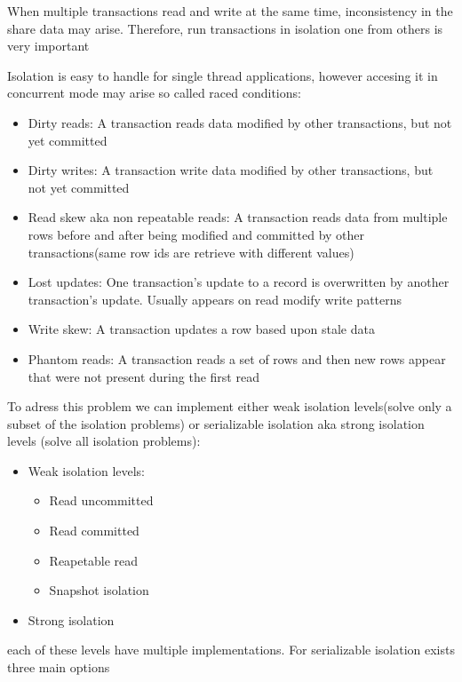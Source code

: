 \documentclass[../../main.tex]{subfiles}
\begin{document}
\begin{definition}[Isolation]
    When multiple transactions read and write at the same time, inconsistency in the
    share data may arise. Therefore, run transactions in isolation one from others is
    very important
\end{definition}
Isolation is easy to handle for single thread applications, however accesing it in
concurrent mode may arise so called raced conditions:
\begin{itemize}
    \item Dirty reads:
        A transaction reads data modified by other transactions, but not yet committed
    \item Dirty writes:
        A transaction write data modified by other transactions, but not yet committed
    \item Read skew aka non repeatable reads:
        A transaction reads data from multiple rows before and after being modified and
        committed by other transactions(same row ids are retrieve with different values)
    \item Lost updates:
        One transaction's update to a record is overwritten by another transaction's
        update. Usually appears on read modify write patterns
    \item Write skew:
        A transaction updates a row based upon stale data
    \item Phantom reads:
        A transaction reads a set of rows and then new rows appear that were not present
        during the first read
\end{itemize}
To adress this problem we can implement either weak isolation levels(solve only a subset
of the isolation problems) or serializable isolation aka strong isolation levels (solve
all isolation problems):
\begin{itemize}
    \item Weak isolation levels:
    \begin{itemize}
        \item Read uncommitted
        \item Read committed
        \item Reapetable read
        \item Snapshot isolation
    \end{itemize}
    \item Strong isolation
\end{itemize}
each of these levels have multiple implementations. For serializable isolation exists
three main options
\end{document}
